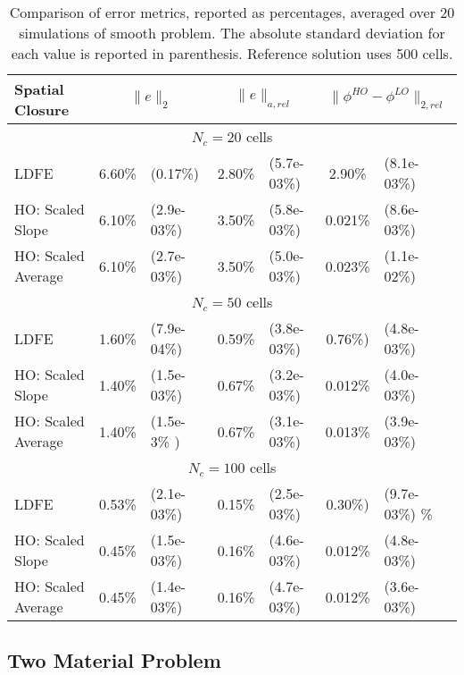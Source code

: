 \begin{table}[H]
    \caption{\label{tab:smooth} Comparison of error metrics, reported as percentages, averaged over 20 simulations of smooth problem.  The absolute
standard deviation for each value is reported in parenthesis. Reference solution uses 500 cells.}
    \begin{tabular}{|l|cl|cl|cl|} \hline
        Spatial Closure & \multicolumn{2}{|c|}{$\|e\|_2$}  &
        \multicolumn{2}{|c|}{$\|e\|_{a,rel}$} & \multicolumn{2}{|c|}{$\|\phi^{HO}
        -\phi^{LO}\|_{2,rel}$} \\  \hline \hline
        \multicolumn{7}{|c|}{$N_c = 20$ cells} \\ \hline
LDFE               &   6.60\%  &   (0.17\%)  &   2.80\%     &   (5.7e-03\%)  &   2.90\%   &  (8.1e-03\%)  \\
HO: Scaled Slope   &   6.10\%  &   (2.9e-03\%)  &   3.50\%  &   (5.8e-03\%)  &   0.021\%  &  (8.6e-03\%)  \\
HO: Scaled Average &   6.10\%  &   (2.7e-03\%)  &   3.50\%  &   (5.0e-03\%)  &   0.023\%  &  (1.1e-02\%)  \\ \hline
       \multicolumn{7}{|c|}{$N_c  = 50$ cells}   \\ \hline
LDFE               &   1.60\%  &   (7.9e-04\%)  &   0.59\%  &   (3.8e-03\%)  &   0.76\%)  &  (4.8e-03\%)  \\
HO: Scaled Slope   &   1.40\%  &   (1.5e-03\%)  &   0.67\%  &   (3.2e-03\%)  &   0.012\%  &  (4.0e-03\%)  \\
HO: Scaled Average &   1.40\%  &   (1.5e-3\% ) &   0.67\%   &   (3.1e-03\%)  &   0.013\%  &  (3.9e-03\%)  \\ \hline
       \multicolumn{7}{|c|}{$N_c  = 100$ cells}   \\ \hline
LDFE               &   0.53\%  &   (2.1e-03\%)  &   0.15\%  &   (2.5e-03\%)  &   0.30\%)  &  (9.7e-03\%)  \%\\
HO: Scaled Slope   &   0.45\%  &   (1.5e-03\%)  &   0.16\%  &   (4.6e-03\%)  &   0.012\%  &  (4.8e-03\%)  \\
HO: Scaled Average &   0.45\%  &   (1.4e-03\%)  &   0.16\%  &   (4.7e-03\%)  &   0.012\%  &  (3.6e-03\%)  \\ \hline
    \end{tabular}
\end{table}



\subsection{Two Material Problem}

